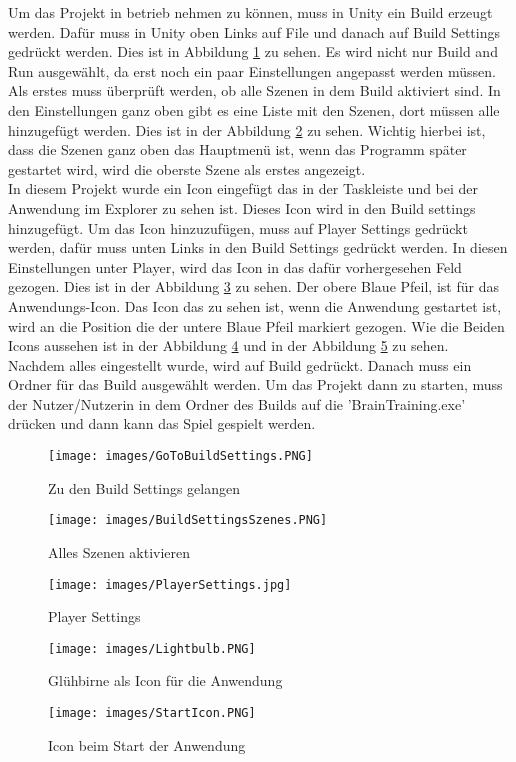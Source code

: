 Um das Projekt in betrieb nehmen zu können, muss in Unity ein Build erzeugt werden. Dafür muss in Unity oben Links auf File und danach auf Build Settings gedrückt werden. Dies ist in Abbildung \ref{GoToBuildSettings} zu sehen. Es wird nicht nur Build and Run ausgewählt, da erst noch ein paar Einstellungen angepasst werden müssen.\\
Als erstes muss überprüft werden, ob alle Szenen in dem Build aktiviert sind. In den Einstellungen ganz oben gibt es eine Liste mit den Szenen, dort müssen alle hinzugefügt werden. Dies ist in der Abbildung \ref{BuildSettingsSzene} zu sehen. Wichtig hierbei ist, dass die Szenen ganz oben das Hauptmenü ist, wenn das Programm später gestartet wird, wird die oberste Szene als erstes angezeigt.\\
In diesem Projekt wurde ein Icon eingefügt das in der Taskleiste und bei der Anwendung im Explorer zu sehen ist. Dieses Icon wird in den Build settings hinzugefügt. Um das Icon hinzuzufügen, muss auf Player Settings gedrückt werden, dafür muss unten Links in den Build Settings gedrückt werden. In diesen Einstellungen unter Player, wird das Icon in das dafür vorhergesehen Feld gezogen. Dies ist in der Abbildung \ref{PlayerSettings} zu sehen. Der obere Blaue Pfeil, ist für das Anwendungs-Icon. Das Icon das zu sehen ist, wenn die Anwendung gestartet ist, wird an die Position die der untere Blaue Pfeil markiert gezogen. Wie die Beiden Icons aussehen ist in der Abbildung \ref{Lightbulb} und in der Abbildung \ref{BrainBook} zu sehen.\\
Nachdem alles eingestellt wurde, wird auf Build gedrückt. Danach muss ein Ordner für das Build ausgewählt werden. Um das Projekt dann zu starten, muss der Nutzer/Nutzerin in dem Ordner des Builds auf die 'BrainTraining.exe' drücken und dann kann das Spiel gespielt werden.
\begin{figure}[htbp]
  \centering
  \texttt{[image: images/GoToBuildSettings.PNG]}
  \caption{Zu den Build Settings gelangen}
  \label{GoToBuildSettings}
\end{figure}
\begin{figure}[htbp]
  \centering
  \texttt{[image: images/BuildSettingsSzenes.PNG]}
  \caption{Alles Szenen aktivieren}
  \label{BuildSettingsSzene}
\end{figure}
\begin{figure}[htbp]
  \centering
  \texttt{[image: images/PlayerSettings.jpg]}
  \caption{Player Settings}
  \label{PlayerSettings}
\end{figure}
\begin{figure}[htbp]
  \centering
  \texttt{[image: images/Lightbulb.PNG]}
  \caption{Glühbirne als Icon für die Anwendung}
  \label{Lightbulb}
\end{figure}
\begin{figure}[htbp]
  \centering
  \texttt{[image: images/StartIcon.PNG]}
  \caption{Icon beim Start der Anwendung}
  \label{BrainBook}
\end{figure}

